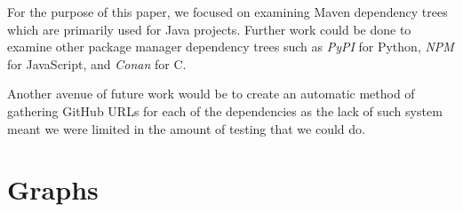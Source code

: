 \documentclass[10pt, compsoc, conference]{IEEEtran}
\begin{document}
For the purpose of this paper, we focused on examining Maven dependency trees which are primarily used for Java projects. Further work could be done to examine other package manager dependency trees such as \textit{PyPI} for Python, \textit{NPM} for JavaScript, and \textit{Conan} for C. 

Another avenue of future work would be to create an automatic method of gathering GitHub URLs for each of the dependencies as the lack of such system meant we were limited in the amount of testing that we could do. 

\printbibliography

\appendices
\section{Graphs}

\ifCLASSOPTIONcaptionsoff
  \newpage
\fi
\end{document}
